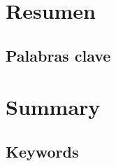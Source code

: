 \renewcommand{\baselinestretch}{1.2}\normalsize
\chapter*{Resumen}



\section*{Palabras clave}


\chapter*{Summary}
 

 
\section*{Keywords}
